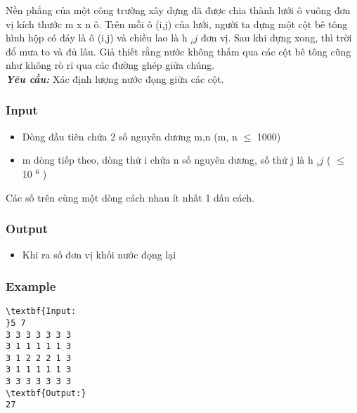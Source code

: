 

Nền phẳng của một công trường xây dựng đã được chia thành lưới ô vuông đơn vị kích thước m x n ô. Trên mỗi ô (i,j) của lưới, người ta dựng một cột bê tông hình hộp có đáy là ô (i,j) và chiều lao là h $_ ij $ đơn vị. Sau khi dựng xong, thì trời đổ mưa to và đủ lâu. Giả thiết rằng nước không thấm qua các cột bê tông cũng như không rò rỉ qua các đường ghép giữa chúng.
\\\textbf{\emph{Yêu cầu: }} Xác định lượng nước đọng giữa các cột.

\subsubsection{Input}
\begin{itemize}
	\item Dòng đầu tiên chứa 2 số nguyên dương m,n (m, n  $\le$ 1000)
	\item m dòng tiếp theo, dòng thứ i chứa n số nguyên dương, số thứ j là h $_ ij $ ( $\le$ 10 $^ 6 $ )
\end{itemize}

Các số trên cùng một dòng cách nhau ít nhất 1 dấu cách.

\subsubsection{Output}
\begin{itemize}
	\item Khi ra số đơn vị khối nước đọng lại
\end{itemize}

\subsubsection{Example}
\begin{verbatim}
\textbf{Input:
}5 7
3 3 3 3 3 3 3
3 1 1 1 1 1 3
3 1 2 2 2 1 3
3 1 1 1 1 1 3
3 3 3 3 3 3 3
\textbf{Output:}
27
\end{verbatim}
